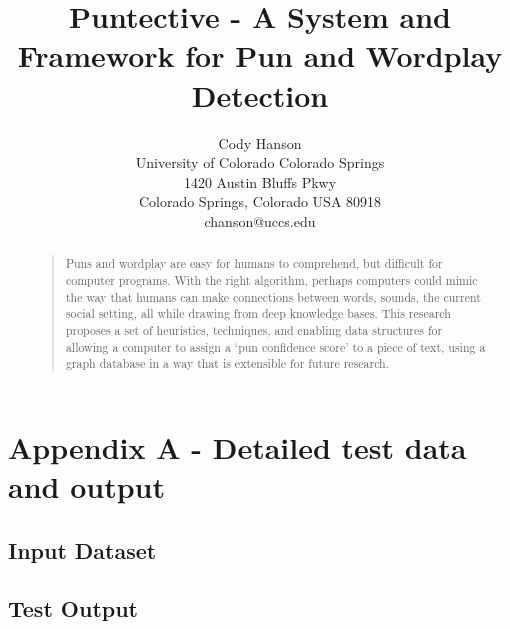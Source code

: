 \documentclass[letterpaper]{article}
\begin{document}
\title{Puntective - A System and Framework for Pun and Wordplay Detection}
\author{Cody Hanson\\
University of Colorado Colorado Springs\\
1420 Austin Bluffs Pkwy\\
Colorado Springs, Colorado USA 80918\\
chanson@uccs.edu}
\maketitle
\begin{abstract}
\begin{quote}
Puns and wordplay are easy for humans to comprehend, but difficult for computer programs.
With the right algorithm, perhaps computers could mimic the way that humans can make connections between words, sounds, the current social setting, all while drawing from deep knowledge bases. 
This research proposes a set of heuristics, techniques, and enabling data structures for allowing a computer to assign a `pun confidence score' to a piece of text, using a graph database in a way that is extensible for future research.
\end{quote}
\end{abstract}








 


\onecolumn
\newpage
\section{Appendix A - Detailed test data and output}
\subsection{Input Dataset}

\subsection{Test Output}

\end{document}

